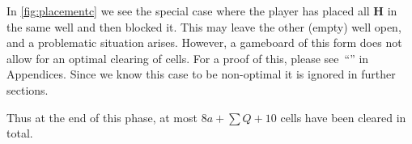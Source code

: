 In \autoref{fig:placementc} we see the special case where the player has placed all $\mathbf{H}$ in the same well and then blocked it. This may leave the other (empty) well open, and a problematic situation arises. However, a gameboard of this form does not allow for an optimal clearing of cells. For a proof of this, please see~``'' in Appendices. Since we know this case to be non-optimal it is ignored in further sections.

Thus at the end of this phase, at most $8a + \sum Q + 10$ cells have been cleared in total.

